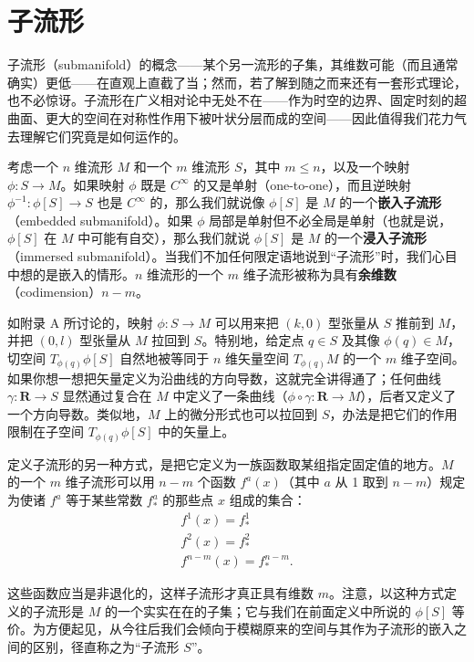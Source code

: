 \chapter{子流形}

子流形（submanifold）的概念——某个另一流形的子集，其维数可能（而且通常确实）更低——在直观上直截了当；然而，若了解到随之而来还有一套形式理论，也不必惊讶。子流形在广义相对论中无处不在——作为时空的边界、固定时刻的超曲面、更大的空间在对称性作用下被叶状分层而成的空间——因此值得我们花力气去理解它们究竟是如何运作的。

考虑一个 $n$ 维流形 $M$ 和一个 $m$ 维流形 $S$，其中 $m \leq n$，以及一个映射 $\phi : S \to M$。如果映射 $\phi$ 既是 $C^\infty$ 的又是单射（one-to-one），而且逆映射 $\phi^{-1} : \phi[S] \to S$ 也是 $C^\infty$ 的，那么我们就说像 $\phi[S]$ 是 $M$ 的一个\textbf{嵌入子流形}（embedded submanifold）。如果 $\phi$ 局部是单射但不必全局是单射（也就是说，$\phi[S]$ 在 $M$ 中可能有自交），那么我们就说 $\phi[S]$ 是 $M$ 的一个\textbf{浸入子流形}（immersed submanifold）。当我们不加任何限定语地说到“子流形”时，我们心目中想的是嵌入的情形。$n$ 维流形的一个 $m$ 维子流形被称为具有\textbf{余维数}（codimension）$n - m$。

如附录 A 所讨论的，映射 $\phi : S \to M$ 可以用来把 $(k,0)$ 型张量从 $S$ 推前到 $M$，并把 $(0,l)$ 型张量从 $M$ 拉回到 $S$。特别地，给定点 $q \in S$ 及其像 $\phi(q) \in M$，切空间 $T_{\phi(q)}\phi[S]$ 自然地被等同于 $n$ 维矢量空间 $T_{\phi(q)}M$ 的一个 $m$ 维子空间。如果你想一想把矢量定义为沿曲线的方向导数，这就完全讲得通了；任何曲线 $\gamma : \mathbf{R} \to S$ 显然通过复合在 $M$ 中定义了一条曲线（$\phi \circ \gamma : \mathbf{R} \to M$），后者又定义了一个方向导数。类似地，$M$ 上的微分形式也可以拉回到 $S$，办法是把它们的作用限制在子空间 $T_{\phi(q)}\phi[S]$ 中的矢量上。

定义子流形的另一种方式，是把它定义为一族函数取某组指定固定值的地方。$M$ 的一个 $m$ 维子流形可以用 $n - m$ 个函数 $f^a(x)$（其中 $a$ 从 1 取到 $n - m$）规定为使诸 $f^a$ 等于某些常数 $f^a_*$ 的那些点 $x$ 组成的集合：
\begin{gather*}
f^1(x) = f^1_* \\
f^2(x) = f^2_* \\[1em]
f^{n-m}(x) = f^{n-m}_*. \tag{C.1}
\end{gather*}

这些函数应当是非退化的，这样子流形才真正具有维数 $m$。注意，以这种方式定义的子流形是 $M$ 的一个实实在在的子集；它与我们在前面定义中所说的 $\phi[S]$ 等价。为方便起见，从今往后我们会倾向于模糊原来的空间与其作为子流形的嵌入之间的区别，径直称之为“子流形 $S$”。

